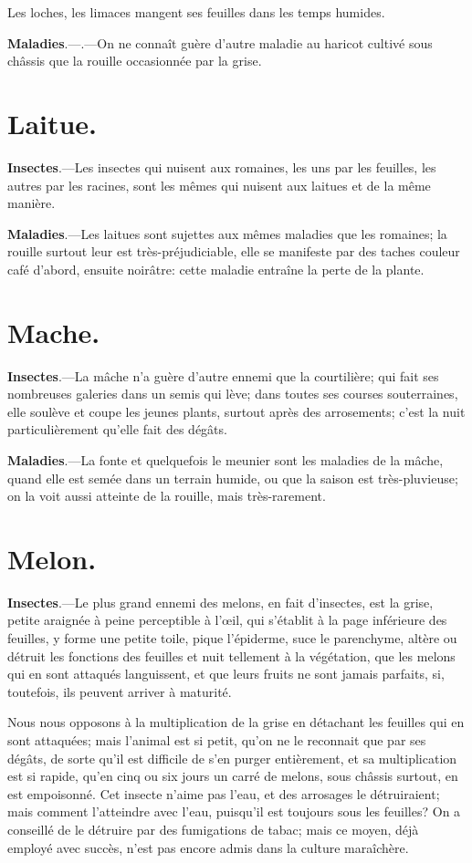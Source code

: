 \documentclass[10pt,a4paper]{book}
\begin{document}
Les loches, les limaces mangent ses feuilles dans les temps humides.

\textbf{Maladies}.---.---On ne connaît guère d'autre maladie au haricot cultivé sous châssis que la rouille occasionnée par la grise.

\section{Laitue.}

\textbf{Insectes}.---Les insectes qui nuisent aux romaines, les uns par les feuilles, les autres par les racines, sont les mêmes qui nuisent aux laitues et de la même manière.

\textbf{Maladies}.---Les laitues sont sujettes aux mêmes maladies que les romaines; la rouille surtout leur est très-préjudiciable, elle se manifeste par des taches couleur café d'abord, ensuite noirâtre: cette maladie entraîne la perte de la plante.

\section{Mache.}

\textbf{Insectes}.---La mâche n'a guère d'autre ennemi que la courtilière; qui fait ses nombreuses galeries dans un semis qui lève; dans toutes ses courses souterraines, elle soulève et coupe les jeunes plants, surtout après des arrosements; c'est la nuit particulièrement qu'elle fait des dégâts.

\textbf{Maladies}.---La fonte et quelquefois le meunier sont les maladies de la mâche, quand elle est semée dans un terrain humide, ou que la saison est très-pluvieuse; on la voit aussi atteinte de la rouille, mais très-rarement.

\section{Melon.}

\textbf{Insectes}.---Le plus grand ennemi des melons, en fait d'insectes, est la grise, petite araignée à peine perceptible à l'œil, qui s'établit à la page inférieure des feuilles, y forme une petite toile, pique l'épiderme, suce le parenchyme, altère ou détruit les fonctions des feuilles et nuit tellement à la végétation, que les melons qui en sont attaqués languissent, et que leurs fruits ne sont jamais parfaits, si, toutefois, ils peuvent arriver à maturité.

Nous nous opposons à la multiplication de la grise en détachant les feuilles qui en sont attaquées; mais l'animal est si petit, qu'on ne le reconnait que par ses dégâts, de sorte qu'il est difficile de s'en purger entièrement, et sa multiplication est si rapide, qu'en cinq ou six jours un carré de melons, sous châssis surtout, en est empoisonné. Cet insecte n'aime pas l'eau, et des arrosages le détruiraient; mais comment l'atteindre avec l'eau, puisqu'il est toujours sous les feuilles? On a conseillé de le détruire par des fumigations de tabac; mais ce moyen, déjà employé avec succès, n'est pas encore admis dans la culture maraîchère.
\end{document}
